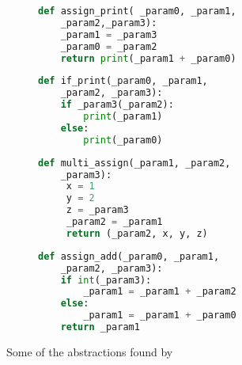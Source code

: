 \begin{figure}
    
    
    \begin{subfigure}[t]{0.45\textwidth}
        \begin{lstlisting}[language=Python, firstnumber=1]
def assign_print( _param0, _param1,
    _param2,_param3):
    _param1 = _param3
    _param0 = _param2
    return print(_param1 + _param0)
        \end{lstlisting}
        \label{fig:func3}
    \end{subfigure}\hfill
    \begin{subfigure}[t]{0.45\textwidth}
        \begin{lstlisting}[language=Python, firstnumber=1]
def if_print(_param0, _param1,
    _param2, _param3):
    if _param3(_param2):
        print(_param1)
    else:
        print(_param0)
        \end{lstlisting}
        \label{fig:func4}
    \end{subfigure}
    
    \vspace{0.5cm} %
    
    \begin{subfigure}[t]{0.45\textwidth}
        \begin{lstlisting}[language=Python, firstnumber=1]
def multi_assign(_param1, _param2,
    _param3):
     x = 1
     y = 2
     z = _param3
     _param2 = _param1
     return (_param2, x, y, z)
        \end{lstlisting}
        \label{fig:func5}
    \end{subfigure}\hfill
\begin{subfigure}[t]{0.45\textwidth}
        \begin{lstlisting}[language=Python, firstnumber=1]
def assign_add(_param0, _param1,
    _param2, _param3):
    if int(_param3):
        _param1 = _param1 + _param2
    else:
        _param1 = _param1 + _param0
    return _param1
        \end{lstlisting}
        \label{fig:func2}
    \end{subfigure}
    
    
    
    \caption{Some of the abstractions found by \toolname}
    \label{fig:leroy-abstractions}
\end{figure}

